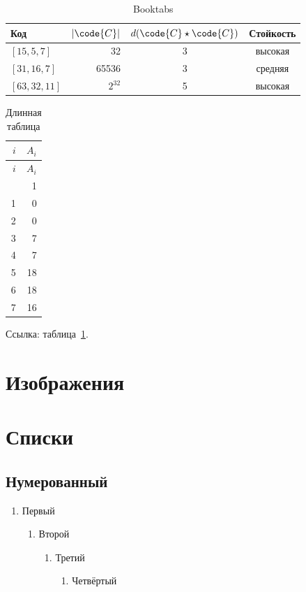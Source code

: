 \documentclass[font=modern]{cmcmsuthesis-phd}
\begin{document}
\begin{table}[htbp]\caption{Booktabs}\label{tab:booktabs}\centering
\begin{tabular}{lrcc}\toprule
\textbf{Код}&\textbf{$|\code{C}|$}&\textbf{$d(\code{C}\star\code{C})$}&\textbf{Стойкость}\\\midrule
$[15,5,7]$&32&3&высокая\\
$[31,16,7]$&65536&3&средняя\\
$[63,32,11]$&$2^{32}$&5&высокая\\\bottomrule
\end{tabular}\end{table}

\begin{longtable}{@{}rr@{}}\caption{Длинная таблица}\label{tab:long}\\
\toprule $i$&$A_i$\\\midrule\endfirsthead
\toprule $i$&$A_i$\\\midrule\endhead\bottomrule\endfoot
0&1\\1&0\\2&0\\3&7\\4&7\\5&18\\6&18\\7&16\\\end{longtable}
Ссылка: таблица~\ref{tab:booktabs}.

\section{Изображения}

\section{Списки}
\subsection{Нумерованный}
\begin{enumerate}\item Первый\begin{enumerate}\item Второй\begin{enumerate}\item Третий\begin{enumerate}\item Четвёртый\end{enumerate}\end{enumerate}\end{enumerate}\end{enumerate}
\end{document}
